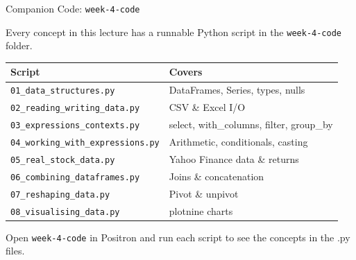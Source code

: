 \documentclass[9pt,aspectratio=169]{beamer}
\begin{document}
\begin{frame}[fragile]{Companion Code: \texttt{week-4-code}}

Every concept in this lecture has a runnable Python script in the \texttt{week-4-code} folder.

\medskip

\begin{tabular}{@{}ll@{}}
\toprule
\textbf{Script} & \textbf{Covers} \\
\midrule
\texttt{01\_data\_structures.py}        & DataFrames, Series, types, nulls \\[0.2em]
\texttt{02\_reading\_writing\_data.py}  & CSV \& Excel I/O \\[0.2em]
\texttt{03\_expressions\_contexts.py}   & select, with\_columns, filter, group\_by \\[0.2em]
\texttt{04\_working\_with\_expressions.py} & Arithmetic, conditionals, casting \\[0.2em]
\texttt{05\_real\_stock\_data.py}       & Yahoo Finance data \& returns \\[0.2em]
\texttt{06\_combining\_dataframes.py}   & Joins \& concatenation \\[0.2em]
\texttt{07\_reshaping\_data.py}         & Pivot \& unpivot \\[0.2em]
\texttt{08\_visualising\_data.py}       & plotnine charts \\
\bottomrule
\end{tabular}

\medskip

\begin{highlightbox}
\centering
Open \texttt{week-4-code} in Positron and run each script to see the concepts in the .py files.
\end{highlightbox}

\end{frame}
\end{document}
